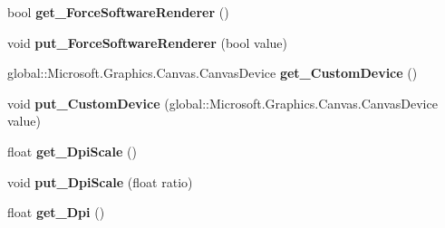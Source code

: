 \begin{DoxyCompactItemize}
bool {\bfseries get\+\_\+\+Force\+Software\+Renderer} ()
\item 
\mbox{\label{class_microsoft_1_1_graphics_1_1_canvas_1_1_u_i_1_1_xaml_1_1_canvas_animated_control_ae2443c631de1a00c1e44d680363acd45}} 
void {\bfseries put\+\_\+\+Force\+Software\+Renderer} (bool value)
\item 
\mbox{\label{class_microsoft_1_1_graphics_1_1_canvas_1_1_u_i_1_1_xaml_1_1_canvas_animated_control_a17fb6529b7f97cb7eec28db12e4e438b}} 
global\+::\+Microsoft.\+Graphics.\+Canvas.\+Canvas\+Device {\bfseries get\+\_\+\+Custom\+Device} ()
\item 
\mbox{\label{class_microsoft_1_1_graphics_1_1_canvas_1_1_u_i_1_1_xaml_1_1_canvas_animated_control_a78fcff8bd800e4cefb4b1a3e7fdf0bbb}} 
void {\bfseries put\+\_\+\+Custom\+Device} (global\+::\+Microsoft.\+Graphics.\+Canvas.\+Canvas\+Device value)
\item 
\mbox{\label{class_microsoft_1_1_graphics_1_1_canvas_1_1_u_i_1_1_xaml_1_1_canvas_animated_control_a0f7a2890504c7e9d2ed733f76f001880}} 
float {\bfseries get\+\_\+\+Dpi\+Scale} ()
\item 
\mbox{\label{class_microsoft_1_1_graphics_1_1_canvas_1_1_u_i_1_1_xaml_1_1_canvas_animated_control_a2d14da04c7f91c1074f1acd0e450c4b4}} 
void {\bfseries put\+\_\+\+Dpi\+Scale} (float ratio)
\item 
\mbox{\label{class_microsoft_1_1_graphics_1_1_canvas_1_1_u_i_1_1_xaml_1_1_canvas_animated_control_a21b8d49117017e05ba0ae216f1361829}} 
float {\bfseries get\+\_\+\+Dpi} ()
\item 
\mbox{\label{class_microsoft_1_1_graphics_1_1_canvas_1_1_u_i_1_1_xaml_1_1_canvas_animated_control_ab0b1da0cf267c685934b92f346cce7cf}} 

\end{DoxyCompactItemize}
